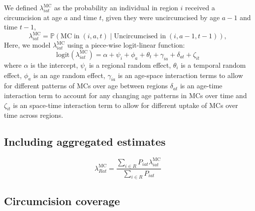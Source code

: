 \documentclass{article}
\begin{document}
\begin{appendix}
We defined $\lambda^{\text{MC}}_{iat}$ as the probability an individual in region $i$ received a circumcision  at age $a$ and time $t$, given they were uncircumcised by age $a-1$ and time $t-1$,  
\begin{equation}
		\lambda^{\text{MC}}_{iat} = \mathbb{P}(\text{MC} \; \text{in} \; (i,a,t) \; | \; \text{Uncircumcised in} \; (i,a-1, t-1)),
	\label{eqn::mc}
\end{equation}
Here, we model $\lambda^{\text{MC}}_{iat}$ using a piece-wise logit-linear function:
\begin{equation*}
	\text{logit}(\lambda^{\text{MC}}_{iat}) = \alpha + \psi_i + \phi_a + \theta_t + \gamma_{ia} + \delta_{at} + \zeta_{it} 
\end{equation*}
where $\alpha$ is the intercept, $\psi_i$ is a regional random effect, $\theta_i$ is a temporal random effect, $\phi_a$ is an age random effect, $\gamma_{ia}$ is an age-space interaction terms to allow for different patterns of MCs over age between regions $\delta_{at}$ is an age-time interaction term to account for any changing age patterns in MCs over time and $\zeta_{it}$ is an space-time interaction term to allow for different uptake of MCs over time across regions. 


\subsection{Including aggregated estimates}
\label{sec::aggregated}


\begin{equation*}
	\lambda^{\text{MC}}_{Rat} = \frac{\sum_{i\in R}P_{iat}\lambda^{\text{MC}}_{iat}}{\sum_{i\in R}P_{iat}}
\end{equation*}




\subsection{Circumcision coverage}
\label{sec::coverage}


\end{appendix}
\end{document}

